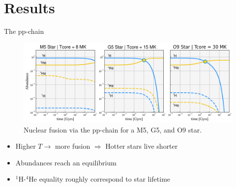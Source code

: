 \section{Results}
\begin{frame}{The pp-chain}
    \begin{figure}
        \centering
        \includegraphics[width = 1\textwidth]{figs/ppCHAIN_FINAL.pdf}
        \caption{Nuclear fusion via the pp-chain for a M5, G5, and O9 star.}
        \label{fig:enter-label}
    \end{figure}
    \begin{itemize}
        \item<2->Higher $T\rightarrow$ more fusion $\Rightarrow$ Hotter stars live shorter
        \item<3->Abundances reach an equilibrium
        \item<4->${}^\text{1}$H-${}^\text{4}$He equality roughly correspond to star lifetime
    \end{itemize}
\end{frame}

